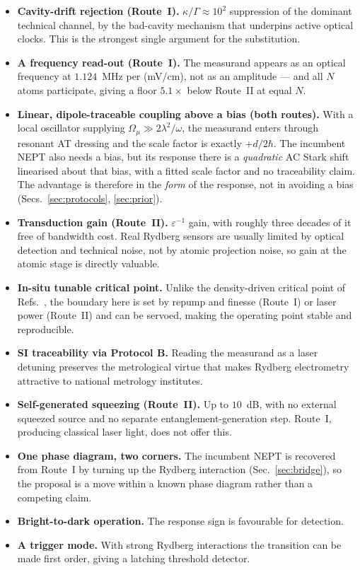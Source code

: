 \documentclass[11pt,a4paper]{article}
\newcommand{\Omu}{\Omega_{\mu}}
\begin{document}
\begin{itemize}
  \item \textbf{Cavity-drift rejection (Route~I).} $\kappa/\Gamma\approx10^2$ suppression of
        the dominant technical channel, by the bad-cavity mechanism that underpins active
        optical clocks. This is the strongest single argument for the substitution.
  \item \textbf{A frequency read-out (Route~I).} The measurand appears as an optical frequency
        at $1.124$~MHz per (mV/cm), not as an amplitude --- and all $N$ atoms participate,
        giving a floor $5.1\times$ below Route~II at equal $N$.
  \item \textbf{Linear, dipole-traceable coupling above a bias (both routes).} With a local
        oscillator supplying $\Omu\gg2\lambda^2/\omega$, the measurand enters through resonant
        AT dressing and the scale factor is exactly $+d/2\hbar$. The incumbent NEPT also needs
        a bias, but its response there is a \emph{quadratic} AC Stark shift linearised about
        that bias, with a fitted scale factor and no traceability claim. The advantage is
        therefore in the \emph{form} of the response, not in avoiding a bias
        (Secs.~\ref{sec:protocols}, \ref{sec:prior}).
  \item \textbf{Transduction gain (Route~II).} $\varepsilon^{-1}$ gain, with roughly
        three decades of it free of bandwidth cost. Real Rydberg sensors are usually limited
        by optical detection and technical noise, not by atomic projection noise, so gain at
        the atomic stage is directly valuable.
  \item \textbf{In-situ tunable critical point.} Unlike the density-driven critical point of
        Refs.~\cite{Ding2022,Wang2025}, the boundary here is set by repump and finesse
        (Route~I) or laser power (Route~II) and can be servoed, making the operating point
        stable and reproducible.
  \item \textbf{SI traceability via Protocol B.} Reading the measurand as a laser detuning
        preserves the metrological virtue that makes Rydberg electrometry attractive to
        national metrology institutes.
  \item \textbf{Self-generated squeezing (Route~II).} Up to $10$~dB, with no external squeezed
        source and no separate entanglement-generation step. Route~I, producing classical laser
        light, does not offer this.
  \item \textbf{One phase diagram, two corners.} The incumbent NEPT is recovered from Route~I
        by turning up the Rydberg interaction (Sec.~\ref{sec:bridge}), so the proposal is a
        move within a known phase diagram rather than a competing claim.
  \item \textbf{Bright-to-dark operation.} The response sign is favourable for detection.
  \item \textbf{A trigger mode.} With strong Rydberg interactions the transition can be made
        first order, giving a latching threshold detector.
\end{itemize}
\end{document}
